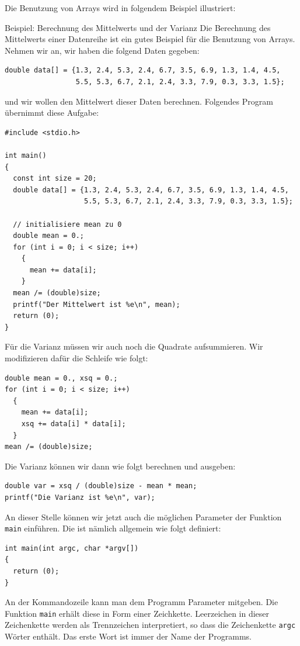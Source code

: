 Die Benutzung von Arrays wird in folgendem Beispiel illustriert:
\begin{myexampleprogram}{Beispiel: Berechnung des Mittelwerts und der Varianz}
  Die Berechnung des Mittelwerts einer Datenreihe ist ein gutes Beispiel für die Benutzung von Arrays.
  Nehmen wir an, wir haben die folgend Daten gegeben:
  \begin{lstlisting}
double data[] = {1.3, 2.4, 5.3, 2.4, 6.7, 3.5, 6.9, 1.3, 1.4, 4.5,
                 5.5, 5.3, 6.7, 2.1, 2.4, 3.3, 7.9, 0.3, 3.3, 1.5};
  \end{lstlisting}
  und wir wollen den Mittelwert dieser Daten berechnen.
  Folgendes Program übernimmt diese Aufgabe:
  \begin{lstlisting}
#include <stdio.h>

int main()
{
  const int size = 20;
  double data[] = {1.3, 2.4, 5.3, 2.4, 6.7, 3.5, 6.9, 1.3, 1.4, 4.5,
                   5.5, 5.3, 6.7, 2.1, 2.4, 3.3, 7.9, 0.3, 3.3, 1.5};

  // initialisiere mean zu 0
  double mean = 0.;
  for (int i = 0; i < size; i++)
    {
      mean += data[i];
    }
  mean /= (double)size;
  printf("Der Mittelwert ist %e\n", mean);
  return (0);
}
  \end{lstlisting}
  Für die Varianz müssen wir auch noch die Quadrate aufsummieren.
  Wir modifizieren dafür die Schleife wie folgt:
  \begin{lstlisting}
double mean = 0., xsq = 0.;
for (int i = 0; i < size; i++)
  {
    mean += data[i];
    xsq += data[i] * data[i];
  }
mean /= (double)size;
  \end{lstlisting}
  Die Varianz können wir dann wie folgt berechnen und ausgeben:
  \begin{lstlisting}
double var = xsq / (double)size - mean * mean;
printf("Die Varianz ist %e\n", var);
  \end{lstlisting}
\end{myexampleprogram}
An dieser Stelle können wir jetzt auch die möglichen Parameter der Funktion \verb|main| einführen.
Die ist nämlich allgemein wie folgt definiert:
\begin{lstlisting}
int main(int argc, char *argv[])
{
  return (0);
}
\end{lstlisting}
An der Kommandozeile kann man dem Programm Parameter mitgeben.
Die Funktion \verb|main| erhält diese in Form einer Zeichkette.
Leerzeichen in dieser Zeichenkette werden als Trennzeichen interpretiert, so dass die Zeichenkette \verb|argc| Wörter enthält.
Das erste Wort ist immer der Name der Programms.
